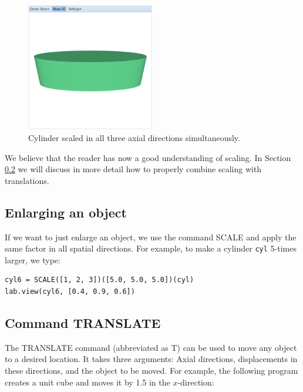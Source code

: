 \documentclass{article}
\begin{document}
\begin{figure}[!ht]
\begin{center}
\includegraphics[width=0.5\textwidth]{img/scale-5.png}
\end{center}
\vspace{-2mm}
\caption{Cylinder scaled in all three axial directions simultaneously.}
\label{fig:scale-5}
\end{figure}
\noindent
We believe that the reader has now a good understanding of scaling.
In Section \ref{sec:translate} we will discuss in more detail how
to properly combine scaling with translations. 

\subsection{Enlarging an object}
If we want to just enlarge an object, we use the command SCALE and 
apply the same factor in all spatial directions. For example, to 
make a cylinder {\tt cyl} 5-times larger, we type:

\begin{verbatim}
cyl6 = SCALE([1, 2, 3])([5.0, 5.0, 5.0])(cyl)
lab.view(cyl6, [0.4, 0.9, 0.6])
\end{verbatim}


\subsection{Command TRANSLATE} \label{sec:translate}

The TRANSLATE command (abbreviated as T) can be used to move any 
object to a desired location. It takes three arguments: Axial directions,
displacements in these directions, and the object to be moved. For example,
the following program creates a unit cube and moves it by 1.5 in the 
$x$-direction:
\end{document}

